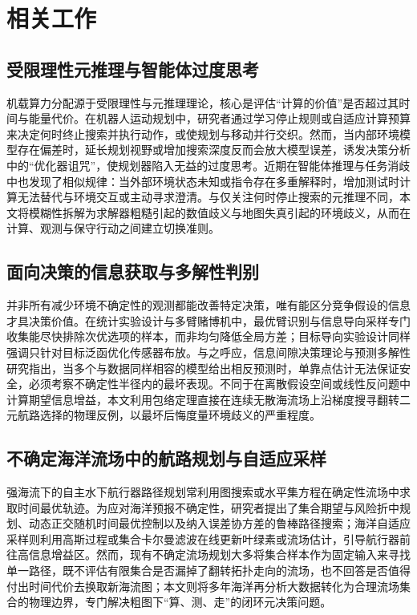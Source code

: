 \section{相关工作}

\subsection{受限理性元推理与智能体过度思考}
机载算力分配源于受限理性与元推理理论，核心是评估“计算的价值”是否超过其时间与能量代价\cite{horvitz1987reasoning,russell1991right}。在机器人运动规划中，研究者通过学习停止规则或自适应计算预算来决定何时终止搜索并执行动作，或使规划与移动并行交织\cite{xiao2020thinking,sung2021quit,elboher2023formal,magnino2026metareasoning}。然而，当内部环境模型存在偏差时，延长规划视野或增加搜索深度反而会放大模型误差，诱发决策分析中的“优化器诅咒”，使规划器陷入无益的过度思考\cite{smith2006curse,jiang2015horizon,cuadron2025overthinking}。近期在智能体推理与任务消歧中也发现了相似规律：当外部环境状态未知或指令存在多重解释时，增加测试时计算无法替代与环境交互或主动寻求澄清\cite{hunt2021formalizing,shen2025thinking,kobalczyk2025active}。与仅关注何时停止搜索的元推理不同，本文将模糊性拆解为求解器粗糙引起的数值歧义与地图失真引起的环境歧义，从而在计算、观测与保守行动之间建立切换准则。

\subsection{面向决策的信息获取与多解性判别}
并非所有减少环境不确定性的观测都能改善特定决策，唯有能区分竞争假设的信息才具决策价值\cite{chernoff1959sequential,box1967discrimination}。在统计实验设计与多臂赌博机中，最优臂识别与信息导向采样专门收集能尽快排除次优选项的样本，而非均匀降低全局方差\cite{garivier2016optimal,russo2018thompson,russo2018ids}；目标导向实验设计同样强调只针对目标泛函优化传感器布放\cite{attia2018goal}。与之呼应，信息间隙决策理论与预测多解性研究指出，当多个与数据同样相容的模型给出相反预测时，单靠点估计无法保证安全，必须考察不确定性半径内的最坏表现\cite{benhaim2006infogap,marx2020predictive}。不同于在离散假设空间或线性反问题中计算期望信息增益，本文利用包络定理直接在连续无散海流场上沿梯度搜寻翻转二元航路选择的物理反例，以最坏后悔度量环境歧义的严重程度。

\subsection{不确定海洋流场中的航路规划与自适应采样}
强海流下的自主水下航行器路径规划常利用图搜索或水平集方程在确定性流场中求取时间最优轨迹\cite{dijkstra1959note,lolla2014levelset}。为应对海洋预报不确定性，研究者提出了集合期望与风险折中规划、动态正交随机时间最优控制以及纳入误差协方差的鲁棒路径搜索\cite{wang2016path,subramani2018stochastic,kularatne2018forecast}；海洋自适应采样则利用高斯过程或集合卡尔曼滤波在线更新叶绿素或流场估计，引导航行器前往高信息增益区\cite{anderson2001eakf,srinivas2012gpucb,hollinger2014sampling,fossum2019}。然而，现有不确定流场规划大多将集合样本作为固定输入来寻找单一路径，既不评估有限集合是否漏掉了翻转拓扑走向的流场，也不回答是否值得付出时间代价去换取新海流图；本文则将多年海洋再分析大数据转化为合理流场集合的物理边界，专门解决粗图下“算、测、走”的闭环元决策问题。
